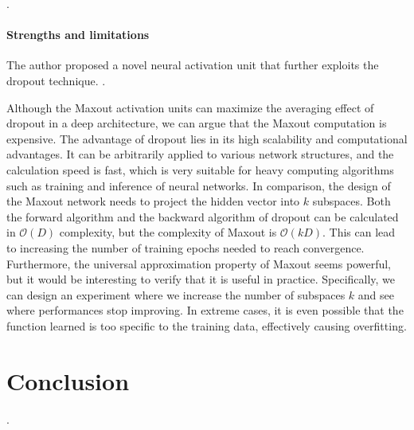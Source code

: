 \documentclass{article}
\begin{document}
\questionSeventeen.

\paragraph{Strengths and limitations} The author proposed a novel
neural activation unit that further exploits the dropout technique.
\questionEighteen.

Although the Maxout activation units can maximize
the averaging effect of dropout in a deep architecture,
we can argue that the Maxout computation
is expensive. The advantage of dropout lies in its high
scalability and computational advantages. It can be arbitrarily
applied to various network structures, and the calculation
speed is fast, which is very suitable for heavy computing
algorithms such as training and inference of neural networks.
In comparison, the design of the Maxout network needs to project the
hidden vector into $k$ subspaces. Both the forward algorithm and the
backward algorithm of dropout can be calculated in $\mathcal{O}(D)$
complexity, but the complexity of Maxout is $\mathcal{O}(kD)$.
This can lead to increasing the number of training epochs needed
to reach convergence.
Furthermore, the universal approximation property of Maxout seems
powerful, but it would be interesting to verify that it is useful
in practice. Specifically, we can design an experiment where we
increase the number of subspaces $k$ and see where performances stop
improving. In extreme cases, it is even possible that the
function learned is too specific to the training data, effectively
causing overfitting.



\section{Conclusion}
\label{sec:concl}

\questionNineteen.


\end{document}
